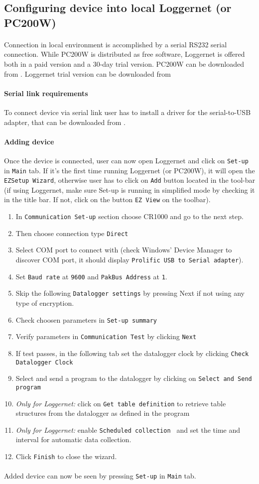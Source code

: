 \subsection{Configuring device into local Loggernet (or PC200W)}
\paragraph{}
Connection in local environment is accomplished by a serial RS232 serial connection. While PC200W is distributed as free software, Loggernet is offered both in a paid version and a 30-day trial version. PC200W can be downloaded from \cite{cs1}. Loggernet trial version can be downloaded from \cite{cs2}
\paragraph{Serial link requirements}
To connect device via serial link user has to install a driver for the serial-to-USB adapter, that can be downloaded from \cite{prol1}. 
\paragraph{Adding device}
Once the device is connected, user can now open Loggernet and click on {\tt Set-up} in {\tt Main} tab. If it's the first time running Loggernet (or PC200W), it will open the {\tt EZSetup Wizard}, 
otherwise user has to click on {\tt Add} button located in the tool-bar (if using Loggernet, make sure Set-up is running in simplified mode by checking it in the title bar. If not, click on the button {\tt EZ View} on the toolbar).
\begin{enumerate}
	\item In {\tt Communication Set-up} section choose CR1000 and go to the next step.
	\item Then choose connection type {\tt Direct}
	\item Select COM port to connect with (check Windows' Device Manager to discover COM port, it should display {\tt Prolific USB to Serial adapter}).
	\item Set {\tt Baud rate} at {\tt 9600} and {\tt PakBus Address} at {\tt 1}.
	\item Skip the following {\tt Datalogger settings} by pressing Next if not using any type of encryption.
	\item Check choosen parameters in {\tt Set-up summary}
	\item Verify parameters in {\tt Communication Test} by clicking {\tt Next}
	\item If test passes, in the following tab set the datalogger clock by clicking {\tt Check Datalogger Clock}
	\item Select and send a program to the datalogger by clicking on {\tt Select and Send program}
	\item \emph{Only for Loggernet:} click on {\tt Get table definition} to retrieve table structures from the datalogger as defined in the program
	\item \emph{Only for Loggernet:} enable {\tt Scheduled collection }  and set the time  and interval for automatic data collection.
	\item Click {\tt Finish} to close the wizard.
\end{enumerate}
\paragraph{}
Added device can now be seen by pressing {\tt Set-up} in {\tt Main} tab.
